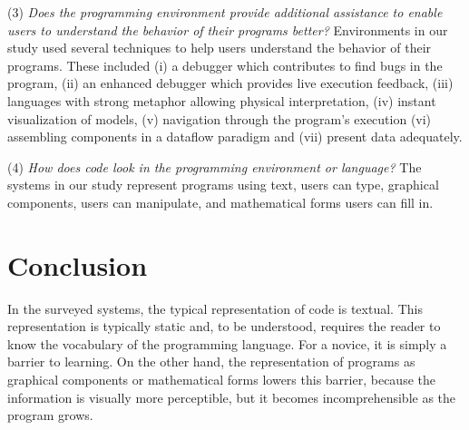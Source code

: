 (3) \textit{Does the programming environment provide additional assistance to enable users to understand the behavior of their programs better?} Environments in our study used several techniques to help users understand the behavior of their programs. These included (i) a debugger which contributes to find bugs in the program, (ii) an enhanced debugger which provides live execution feedback, (iii) languages with strong metaphor allowing physical interpretation, (iv) instant visualization of models, (v) navigation through the program's execution (vi) assembling components in a dataflow paradigm and (vii) present data adequately.

(4) \textit{How does code look in the programming environment or language?} The systems in our study represent programs using text, users can type, graphical components, users can manipulate, and mathematical forms users can fill in.

\section{Conclusion}

In the surveyed systems, the typical representation of code is textual. This representation is typically static and, to be understood, requires the reader to know the vocabulary of the programming language. For a novice, it is simply a barrier to learning. On the other hand, the representation of programs as graphical components or mathematical forms lowers this barrier, because the information is visually more perceptible, but it becomes incomprehensible as the program grows.